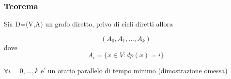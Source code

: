 \documentclass{article}
\begin{document}
        \subsubsection{Teorema}
        \begin{flushleft}
          Sia D=(V,A) un grafo diretto, privo di cicli diretti allora
        \end{flushleft}
        \begin{equation*}
          (A_0,A_1,...,A_k)
        \end{equation*}
        dove
        \begin{equation*}
          A_i=\{ x\in V: dp(x)=i \}
        \end{equation*}
        \begin{flushleft}
          $\forall i=0,...,k$ e' un orario parallelo di tempo minimo (dimostrazione omessa)
        \end{flushleft}


      
\end{document}
